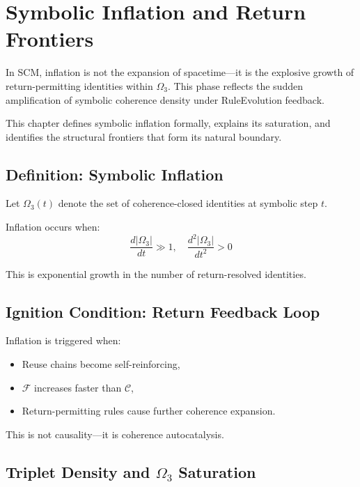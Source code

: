 \chapter{Symbolic Inflation and Return Frontiers} \label{chapter-inflation}

In SCM, inflation is not the expansion of spacetime—it is the explosive growth of return-permitting identities within $\Omega_3$. This phase reflects the sudden amplification of symbolic coherence density under RuleEvolution feedback.

This chapter defines symbolic inflation formally, explains its saturation, and identifies the structural frontiers that form its natural boundary.

\section{Definition: Symbolic Inflation} \label{sec:def-inflation}

Let $\Omega_3(t)$ denote the set of coherence-closed identities at symbolic step $t$.

\begin{definition}
Inflation occurs when:
\[
\frac{d|\Omega_3|}{dt} \gg 1,\quad \frac{d^2|\Omega_3|}{dt^2} > 0
\]
\end{definition}

This is exponential growth in the number of return-resolved identities.

\section{Ignition Condition: Return Feedback Loop} \label{sec:feedback-loop}

Inflation is triggered when:
\begin{itemize}
  \item Reuse chains become self-reinforcing,
  \item $\mathcal{F}$ increases faster than $\mathcal{C}$,
  \item Return-permitting rules cause further coherence expansion.
\end{itemize}

This is not causality—it is coherence autocatalysis.

\section{Triplet Density and $\Omega_3$ Saturation} \label{sec:triplet-density}

